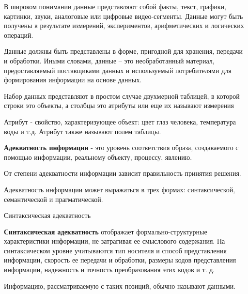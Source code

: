 \documentclass{beamer}
\begin{document}
\begin{frame}

В широком понимании данные представляют собой факты, текст,
графики, картинки, звуки, аналоговые или цифровые видео-сегменты.
Данные могут быть получены в результате измерений, экспериментов,
арифметических и логических операций.

\end{frame}

\begin{frame}
Данные должны быть представлены в форме, пригодной для 
хранения, передачи и обработки. Иными словами, данные --
это необработанный материал, предоставляемый поставщиками данных и используемый
потребителями для формирования информации на основе данных.
\end{frame}

\begin{frame}
Набор данных  представляют в простом случае двухмерной таблицей, в которой 
строки это объекты, а столбцы это атрибуты или еще их называют измерения

Атрибут - свойство, характеризующее объект: цвет глаз человека,
температура воды и т.д. Атрибут также называют полем таблицы.
\end{frame}



\begin{frame}

\textbf{Адекватность информации } - это уровень соответствия образа, создаваемого с помощью информации, реальному объекту, процессу, явлению.
 
 От степени адекватности информации зависит правильность принятия решения.

Адекватность информации может выражаться в трех формах: синтаксической, семантической и прагматической.

\end{frame}

\begin{frame}{Синтаксическая адекватность}

\textbf{Синтаксическая адекватность} отображает формально-структурные характеристики информации, не затрагивая ее смыслового содержания. 
На синтаксическом уровне учитываются тип носителя и способ представления информации, 
скорость ее передачи и обработки, размеры кодов представления информации, 
надежность и точность преобразования этих кодов и т. д.

Информацию, рассматриваемую с таких позиций, обычно называют данными.

\end{frame}
\end{document}
